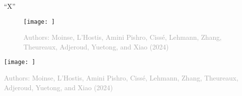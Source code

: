 “X”


    \begin{figure}[h!] %
    \centering
\texttt{[image: ]}
\caption{}
    \label{fig:}
    \begin{flushright}
    \begin{minipage}{1\linewidth}
        \justifying
        \noindent
\scriptsize{\textcolor{darkgray}{Authors: Moinse, L'Hostis, Amini Pishro, Cissé, Lehmann, Zhang, Theureaux, Adjeroud, Yuetong, and Xiao (2024)}}
        \end{minipage}
    \end{flushright}
    \end{figure}

    \begin{figure*}[h!] %
    \centering
\texttt{[image: ]}
\caption{}
    \label{fig:}
    \begin{flushright}
    \begin{minipage}{1\linewidth}
        \justifying
        \noindent
\scriptsize{\textcolor{darkgray}{Authors: Moinse, L'Hostis, Amini Pishro, Cissé, Lehmann, Zhang, Theureaux, Adjeroud, Yuetong, and Xiao (2024)}}
        \end{minipage}
    \end{flushright}
    \end{figure*}